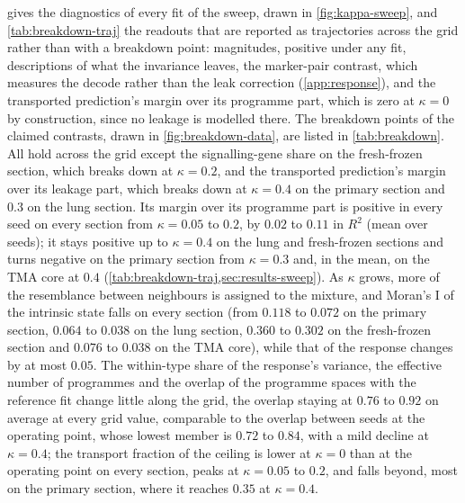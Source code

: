  gives the diagnostics of every fit of the sweep, drawn in \cref{fig:kappa-sweep}, and \cref{tab:breakdown-traj} the readouts that are reported as trajectories across the grid rather than with a breakdown point: magnitudes, positive under any fit, descriptions of what the invariance leaves, the marker-pair contrast, which measures the decode rather than the leak correction (\cref{app:response}), and the transported prediction's margin over its programme part, which is zero at $\kappa = 0$ by construction, since no leakage is modelled there. The breakdown points of the claimed contrasts, drawn in \cref{fig:breakdown-data}, are listed in \cref{tab:breakdown}. All hold across the grid except the signalling-gene share on the fresh-frozen section, which breaks down at $\kappa = 0.2$, and the transported prediction's margin over its leakage part, which breaks down at $\kappa = 0.4$ on the primary section and $0.3$ on the lung section. Its margin over its programme part is positive in every seed on every section from $\kappa = 0.05$ to $0.2$, by $0.02$ to $0.11$ in $R^2$ (mean over seeds); it stays positive up to $\kappa = 0.4$ on the lung and fresh-frozen sections and turns negative on the primary section from $\kappa = 0.3$ and, in the mean, on the TMA core at $0.4$ (\cref{tab:breakdown-traj,sec:results-sweep}). As $\kappa$ grows, more of the resemblance between neighbours is assigned to the mixture, and Moran's I of the intrinsic state falls on every section (from $0.118$ to $0.072$ on the primary section, $0.064$ to $0.038$ on the lung section, $0.360$ to $0.302$ on the fresh-frozen section and $0.076$ to $0.038$ on the TMA core), while that of the response changes by at most $0.05$. The within-type share of the response's variance, the effective number of programmes and the overlap of the programme spaces with the reference fit change little along the grid, the overlap staying at $0.76$ to $0.92$ on average at every grid value, comparable to the overlap between seeds at the operating point, whose lowest member is $0.72$ to $0.84$, with a mild decline at $\kappa = 0.4$; the transport fraction of the ceiling is lower at $\kappa = 0$ than at the operating point on every section, peaks at $\kappa = 0.05$ to $0.2$, and falls beyond, most on the primary section, where it reaches $0.35$ at $\kappa = 0.4$.

